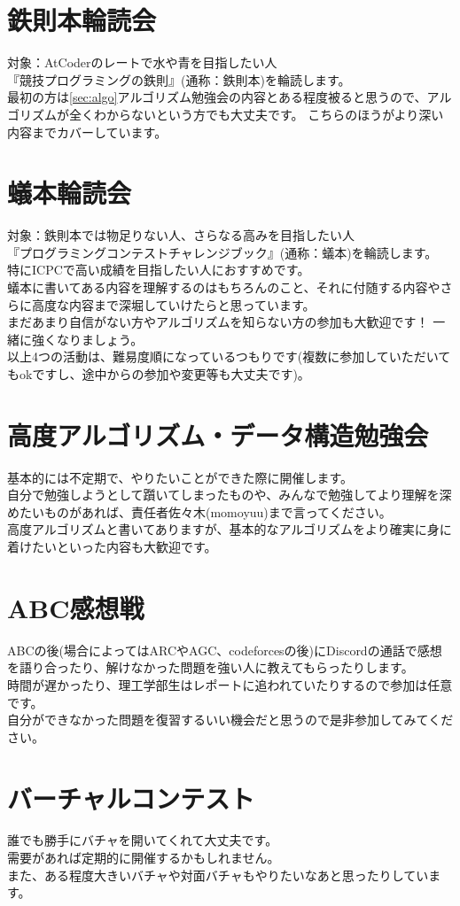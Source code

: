 \documentclass[a4paper, landscape]{jsarticle}
\begin{document}
\section{鉄則本輪読会}
\noindent
対象：AtCoderのレートで水や青を目指したい人\\
\indent
『競技プログラミングの鉄則』(通称：鉄則本)を輪読します。\\
最初の方は\ref{sec:algo}アルゴリズム勉強会の内容とある程度被ると思うので、アルゴリズムが全くわからないという方でも大丈夫です。
こちらのほうがより深い内容までカバーしています。

\section{蟻本輪読会}
\noindent
対象：鉄則本では物足りない人、さらなる高みを目指したい人 \\
\indent
『プログラミングコンテストチャレンジブック』(通称：蟻本)を輪読します。\\
特にICPCで高い成績を目指したい人におすすめです。\\
蟻本に書いてある内容を理解するのはもちろんのこと、それに付随する内容やさらに高度な内容まで深堀していけたらと思っています。\\
まだあまり自信がない方やアルゴリズムを知らない方の参加も大歓迎です！
一緒に強くなりましょう。
\\

以上4つの活動は、難易度順になっているつもりです(複数に参加していただいてもokですし、途中からの参加や変更等も大丈夫です)。
\\

\section{高度アルゴリズム・データ構造勉強会}
基本的には不定期で、やりたいことができた際に開催します。\\
自分で勉強しようとして躓いてしまったものや、みんなで勉強してより理解を深めたいものがあれば、責任者佐々木(momoyuu)まで言ってください。\\
高度アルゴリズムと書いてありますが、基本的なアルゴリズムをより確実に身に着けたいといった内容も大歓迎です。

\section{ABC感想戦}
ABCの後(場合によってはARCやAGC、codeforcesの後)にDiscordの通話で感想を語り合ったり、解けなかった問題を強い人に教えてもらったりします。\\
時間が遅かったり、理工学部生はレポートに追われていたりするので参加は任意です。\\
自分ができなかった問題を復習するいい機会だと思うので是非参加してみてください。

\section{バーチャルコンテスト}
誰でも勝手にバチャを開いてくれて大丈夫です。\\
需要があれば定期的に開催するかもしれません。\\
また、ある程度大きいバチャや対面バチャもやりたいなあと思ったりしています。\\
\end{document}
